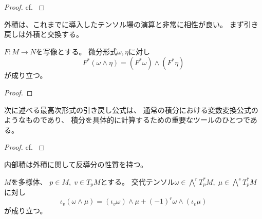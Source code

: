 \documentclass[report]{jlreq}
\begin{document}
\begin{proof}
    cf. \cite[p.356]{Lee12}
\end{proof}

外積は、これまでに導入したテンソル場の演算と非常に相性が良い。
まず引き戻しは外積と交換する。

\begin{proposition}[引き戻しと外積の関係]
    $F \colon M \to N$を{\smooth}写像とする。
    微分形式$\omega, \eta$に対し
    \begin{equation}
        F^*(\omega \wedge \eta) = (F^*\omega) \wedge (F^* \eta)
    \end{equation}
    が成り立つ。
\end{proposition}

\begin{proof}
    \TODO{}
\end{proof}

次に述べる最高次形式の引き戻し公式は、
通常の積分における変数変換公式のようなものであり、
積分を具体的に計算するための重要なツールのひとつである。


\begin{proof}
    cf. \cite[p.361]{Lee12}
\end{proof}

内部積は外積に関して反導分の性質を持つ。

\begin{proposition}[外積に関する内部積の反導分性]
    $M$を多様体、
    $p \in M, \; v \in T_pM$とする。
    交代テンソル$\omega \in \bigwedge^r T_p^*M, \; \mu \in \bigwedge^s T_p^* M$
    に対し
    \begin{equation}
        \iota_v (\omega \wedge \mu)
            = (\iota_v \omega) \wedge \mu + (-1)^{r} \omega \wedge (\iota_v \mu)
    \end{equation}
    が成り立つ。
\end{proposition}
\end{document}
